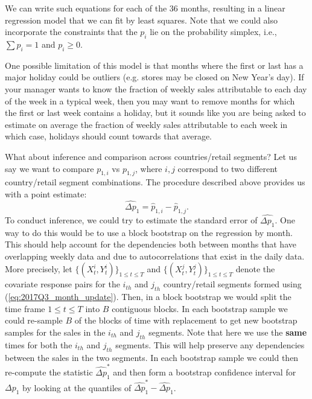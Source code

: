 We can write such equations for each of the 36 months, resulting in a linear regression model that we can fit by least squares. Note that we could also incorporate the constraints that the $p_i$ lie on the probability simplex, i.e., $\sum p_i = 1$ and $p_i \geq 0$. 

One possible limitation of this model is that months where the first or last has a major holiday could be outliers (e.g. stores may be closed on New Year's day). If your manager wants to know the fraction of weekly sales attributable to each day of the week in a typical week, then you may want to remove months for which the first or last week contains a holiday, but it sounds like you are being asked to estimate on average the fraction of weekly sales attributable to each week in which case, holidays should count towards that average.

What about inference and comparison across countries/retail segments? Let us say we want to compare $p_{1,i}$ vs $p_{1,j}$, where $i,j$ correspond to two different country/retail segment combinations. The procedure described above provides us with a point estimate:
$$\widehat{\Delta p}_1 = \widehat{p}_{1,i} - \widehat{p}_{1,j}.$$
To conduct inference, we could try to estimate the standard error of $\widehat{\Delta p_1}$. One way to do this would be to use a block bootstrap on the regression by month. This should help account for the dependencies both between months that have overlapping weekly data and due to autocorrelations that exist in the daily data.\\

 More precisely, let $\{(X^{i}_t,Y^{i}_t)\}_{1 \leq t \leq T}$ and  $\{(X^{j}_t,Y^{j}_t)\}_{1 \leq t \leq T}$ denote the covariate response pairs for the $i_{th}$ and $j_{th}$ country/retail segments formed using (\ref{eq:2017Q3_month_update}). Then, in a block bootstrap we would split the time frame $1 \leq t \leq T$ into $B$ contiguous blocks. In each bootstrap sample we could re-sample $B$ of the blocks of time with replacement to get new bootstrap samples for the sales in the $i_{th}$ and $j_{th}$ segments. Note that here we use the \textbf{same} times for both the $i_{th}$ and $j_{th}$ segments. This will help preserve any dependencies between the sales in the two segments. In each bootstrap sample we could then re-compute the statistic $\widehat{\Delta p}_1^*$ and then form a bootstrap confidence interval for $\Delta p_1$ by looking at the quantiles of $\widehat{\Delta p}_1^* - \widehat{\Delta p}_1$. 
 





